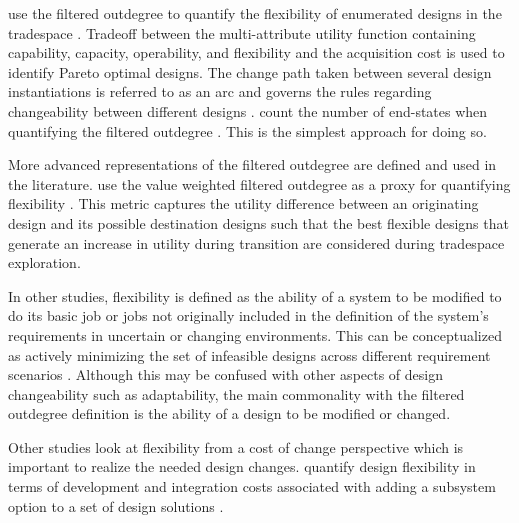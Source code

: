 \citeauthor{Rehn2018} use the filtered outdegree to quantify the flexibility of enumerated designs in the tradespace \cite{Rehn2018}. Tradeoff between the multi-attribute utility function containing capability, capacity, operability, and flexibility and the acquisition cost is used to identify Pareto optimal designs. The change path taken between several design instantiations is referred to as an arc and governs the rules regarding changeability between different designs \cite{Rehn2018, Viscito2009, Ross2008, Rapp2018}. \citeauthor{Rehn2018} count the number of end-states when quantifying the filtered outdegree \cite{Rehn2018}. This is the simplest approach for doing so.

More advanced representations of the filtered outdegree are defined and used in the literature. \citeauthor{Viscito2009} use the value weighted filtered outdegree as a proxy for quantifying flexibility \cite{Viscito2009}. This metric captures the utility difference between an originating design and its possible destination designs such that the best flexible designs that generate an increase in utility during transition are considered during tradespace exploration.

In other studies, flexibility is defined as the ability of a system to be modified to do its basic job or jobs not originally included in the definition of the system’s requirements in uncertain or changing environments. This can be conceptualized as actively minimizing the set of infeasible designs across different requirement scenarios \cite{Chalupnik2013}. Although this may be confused with other aspects of design changeability such as adaptability, the main commonality with the filtered outdegree definition is the ability of a design to be modified or changed.

Other studies look at flexibility from a cost of change perspective which is important to realize the needed design changes. \citeauthor{Rapp2018} quantify design flexibility in terms of development and integration costs associated with adding a subsystem option to a set of design solutions \cite{Rapp2018}. 

